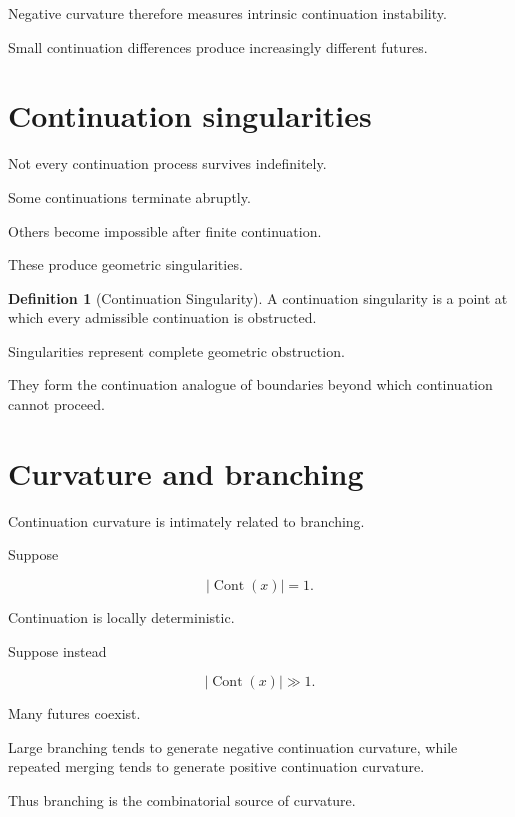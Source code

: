 \documentclass[13pt,openany]{book}
\theoremstyle{plain}
\theoremstyle{definition}
\newtheorem{definition}{Definition}[chapter]
\begin{document}
Negative curvature therefore measures intrinsic continuation instability.

Small continuation differences produce increasingly different futures.


\section{Continuation singularities}

Not every continuation process survives indefinitely.

Some continuations terminate abruptly.

Others become impossible after finite continuation.

These produce geometric singularities.

\begin{definition}[Continuation Singularity]

A continuation singularity is a point at which every admissible continuation is obstructed.

\end{definition}

Singularities represent complete geometric obstruction.

They form the continuation analogue of boundaries beyond which continuation cannot proceed.


\section{Curvature and branching}

Continuation curvature is intimately related to branching.

Suppose

\[
|\operatorname{Cont}(x)|=1.
\]

Continuation is locally deterministic.

Suppose instead

\[
|\operatorname{Cont}(x)|\gg1.
\]

Many futures coexist.

Large branching tends to generate negative continuation curvature, while repeated merging tends to generate positive continuation curvature.

Thus branching is the combinatorial source of curvature.
\end{document}
